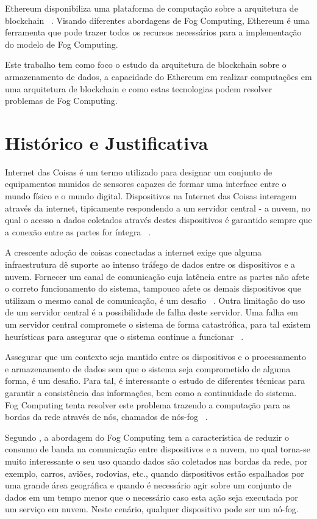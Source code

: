 \documentclass[tcc-proposta]{texufpel}
\begin{document}
Ethereum disponibiliza uma plataforma de computação sobre a arquitetura de blockchain ~\cite{dannen2017introducing}. Visando diferentes abordagens de Fog Computing, Ethereum é uma ferramenta que pode trazer todos os recursos necessários para a implementação do modelo de Fog Computing.
	
Este trabalho tem como foco o estudo da arquitetura de blockchain sobre o armazenamento de dados, a capacidade do Ethereum em realizar computações em uma arquitetura de blockchain e como estas tecnologias podem resolver problemas de Fog Computing.
	
	
\chapter{Histórico e Justificativa}
	
Internet das Coisas é um termo utilizado para designar um conjunto de equipamentos munidos de sensores capazes de formar uma interface entre o mundo físico e o mundo digital. Dispositivos na Internet das Coisas interagem através da internet, tipicamente respondendo a um servidor central - a nuvem, no qual o acesso a dados coletados através destes dispositivos é garantido sempre que a conexão entre as partes for íntegra ~\cite{minerva2015towards}.
	
A crescente adoção de coisas conectadas a internet exige que alguma infraestrutura dê suporte ao intenso tráfego de dados entre os dispositivos e a nuvem. Fornecer um canal de comunicação cuja latência entre as partes não afete o correto funcionamento do sistema, tampouco afete os demais dispositivos que utilizam o mesmo canal de comunicação, é um desafio ~\cite{rosa2017exehda}. Outra limitação do uso de um servidor central é a possibilidade de falha deste servidor. Uma falha em um servidor central compromete o sistema de forma catastrófica, para tal existem heurísticas para assegurar que o sistema continue a funcionar ~\cite{coulouris2005distributed}.

Assegurar que um contexto seja mantido entre os dispositivos e o processamento e armazenamento de dados sem que o sistema seja comprometido de alguma forma, é um desafio. Para tal, é interessante o estudo de diferentes técnicas para garantir a consistência das informações, bem como a continuidade do sistema. Fog Computing tenta resolver este problema trazendo a computação para as bordas da rede através de nós, chamados de nós-fog ~\cite{Bonomi2012}.
	
Segundo \cite{Bonomi2012}, a abordagem do Fog Computing tem a característica de reduzir o consumo de banda na comunicação entre dispositivos e a nuvem, no qual torna-se muito interessante o seu uso quando dados são coletados nas bordas da rede, por exemplo, carros, aviões, rodovias, etc., quando dispositivos estão espalhados por uma grande área geográfica e quando é necessário agir sobre um conjunto de dados em um tempo menor que o necessário caso esta ação seja executada por um serviço em nuvem. Neste cenário, qualquer dispositivo pode ser um nó-fog.
	
\end{document}
